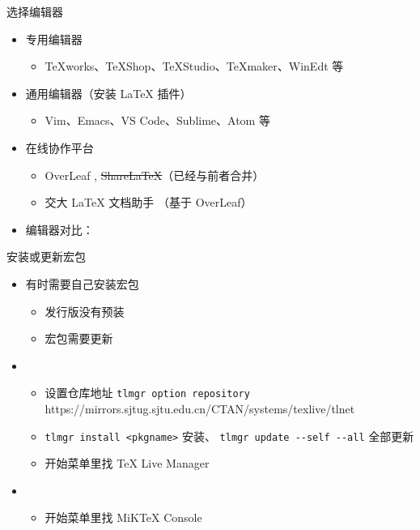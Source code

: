 \begin{frame}{选择编辑器}
  \begin{itemize}
    \item 专用编辑器
          \begin{itemize}
            \item TeXworks、TeXShop、\alert{TeXStudio}、TeXmaker、WinEdt 等
          \end{itemize}
    \item 通用编辑器（安装 \LaTeX{} 插件）
          \begin{itemize}
            \item Vim、Emacs、\alert{VS Code}、Sublime、Atom 等
          \end{itemize}
    \item 在线协作平台
          \begin{itemize}
            \item OverLeaf ,
                  \sout{ShareLaTeX}（已经与前者合并）
            \item 交大 LaTeX 文档助手 （基于 OverLeaf）
          \end{itemize}
    \item 编辑器对比：
  \end{itemize}
\end{frame}

\begin{frame}[fragile]{安装或更新宏包}
  \begin{itemize}
    \item 有时需要自己安装宏包
          \begin{itemize}
            \item 发行版没有预装
            \item 宏包需要更新
          \end{itemize}
    \item \TL
          \begin{itemize}
            \item 设置仓库地址 \verb|tlmgr option repository| {\footnotesize\ttfamily
                  https://mirrors.sjtug.sjtu.edu.cn/CTAN/systems/texlive/tlnet}
            \item \verb|tlmgr install <pkgname>| 安装、 \verb|tlmgr update --self --all| 全部更新
            \item \faWindows{} 开始菜单里找 TeX Live Manager
          \end{itemize}
    \item \MiKTeX
          \begin{itemize}
            \item \faWindows{} 开始菜单里找 MiKTeX Console
          \end{itemize}
  \end{itemize}
\end{frame}
